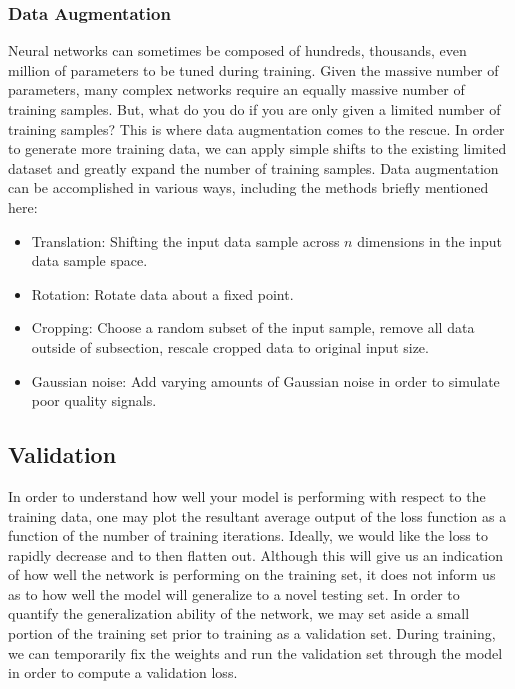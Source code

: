 \subsubsection{Data Augmentation}

Neural networks can sometimes be composed of hundreds, thousands, even million of parameters to be tuned during training. Given the massive number of parameters, many complex networks require an equally massive number of training samples. But, what do you do if you are only given a limited number of training samples? This is where data augmentation comes to the rescue. In order to generate more training data, we can apply simple shifts to the existing limited dataset and greatly expand the number of training samples. Data augmentation can be accomplished in various ways, including the methods briefly 
mentioned here:

\begin{itemize}
    \item Translation: Shifting the input data sample across $n$ dimensions in the input data sample space.
    \item Rotation: Rotate data about a fixed point.
    \item Cropping: Choose a random subset of the input sample, remove all data outside of subsection, rescale cropped data to original input size.
    \item Gaussian noise: Add varying amounts of Gaussian noise in order to simulate poor quality signals.
\end{itemize}

%
%
\subsection{Validation}
In order to understand how well your model is performing with respect to the training data, one may plot the resultant average output of the loss function as a function of the number of training iterations. Ideally, we would like the loss to rapidly decrease and to then flatten out. Although this will give us an indication of how well the network is performing on the training set, it does not inform us as to how well the model will generalize to a novel testing set. In order to quantify the generalization ability of the network, we may set aside a small portion of the training set prior to training as a validation set. During training, we can temporarily fix the weights and run the validation set through the model in order to compute a validation loss. 

